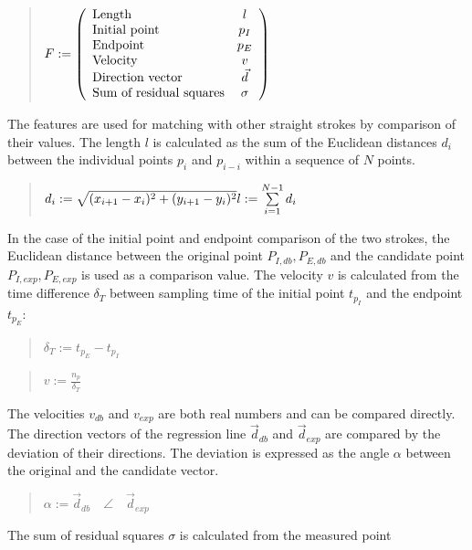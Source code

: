 \begin{quote}
\(
    F :=
    \left( 
    \begin {array} {l c} 
        \text{Length} & l \\
        \text{Initial point} & p_{I} \\
        \text{Endpoint} & p_{E} \\
        \text{Velocity} & v \\
        \text{Direction vector} & \vec{d} \\
        \text{Sum of residual squares} & \sigma \\
    \end {array} 
    \right)
\)
\end{quote}
The features are used for matching with other straight strokes by comparison
of their values. 
The length \(l\) is calculated as the sum of the Euclidean distances \(d_i\) 
between the individual points \(p_i\) and \(p_{i-i}\)  within a sequence 
of \(N\) points. 
\begin{quote}
\(
    d_i := \sqrt{(x_{i+1}-x_{i})^2+(y_{i+1}-y_{i})^2}\\
    l := \sum\limits_{i=1}^{N-1}{d_i}
\)
\end{quote}
In the case of the initial point and endpoint comparison of the two strokes, 
the Euclidean distance between the original point \(P_{I,db},P_{E,db}\)
and the candidate point \(P_{I,exp},P_{E,exp}\) is used as a comparison value.
The velocity \(v\) is calculated from the time difference \( \delta_T \) between 
sampling time of the initial point \(t_{p_I}\) and the endpoint \(t_{p_E}\):
\begin{quote}
\(
    \delta_T :=
        t_{p_E} - t_{p_I}
\)
\end{quote}
\begin{quote}
\(
    v := \frac{n_p}{\delta_T}
\)
\end{quote}
The velocities \(v_{db}\) and \(v_{exp}\) are both real numbers and can be 
compared directly.
The direction vectors of the regression line \(\vec{d}_{db}\) and \(\vec{d}_{exp}\)
are compared by the deviation of their directions.
The deviation is expressed as the angle \( \alpha \) between the original and 
the candidate vector.
\begin{quote}
\(
    \alpha := \vec{d}_{db} \quad \angle \quad \vec{d}_{exp}
\)
\end{quote}
The sum of residual squares \( \sigma \) is calculated from the measured point
